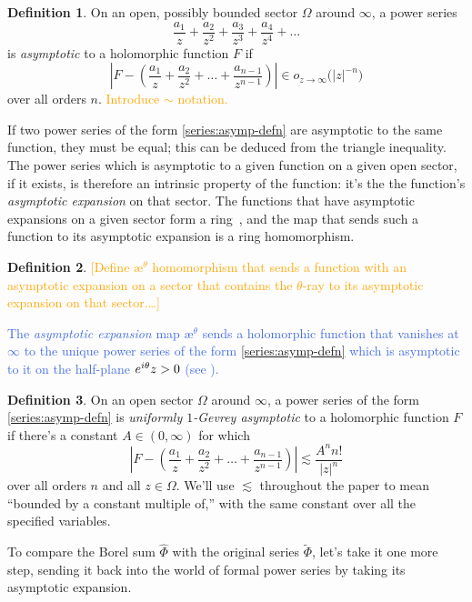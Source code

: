 \documentclass{article}
\let\Re\relax
\DeclareMathOperator{\Re}{Re}
\theoremstyle{definition}
\newtheorem{defn}{Definition}
\newcommand{\series}[1]{\tilde{#1}}
\newcommand{\aexp}{\text{\ae}}
\theoremstyle{plain}
\begin{document}
\begin{defn}
On an open, possibly bounded sector $\Omega$ around $\infty$, a power series
\begin{equation}\label{series:asymp-defn}
\frac{a_1}{z} + \frac{a_2}{z^2} + \frac{a_3}{z^3} + \frac{a_4}{z^4} + \ldots
\end{equation}
is {\em asymptotic} to a holomorphic function $F$ if
\[ \left|F - \left(\frac{a_1}{z} + \frac{a_2}{z^2} + \ldots + \frac{a_{n-1}}{z^{n-1}} \right) \right| \in o_{z \to \infty}\big(|z|^{-n}\big) \]
over all orders $n$. \textcolor{orange}{Introduce $\sim$ notation.}
\end{defn}
If two power series of the form \eqref{series:asymp-defn} are asymptotic to the same function, they must be equal; this can be deduced from the triangle inequality. The power series which is asymptotic to a given function on a given open sector, if it exists, is therefore an intrinsic property of the function: it's the the function's {\em asymptotic expansion} on that sector. The functions that have asymptotic expansions on a given sector form a ring~\cite[Section~A.4]{nikolaev2023existence}, and the map that sends such a function to its asymptotic expansion is a ring homomorphism.

\begin{defn}
\textcolor{orange}{[Define $\aexp^\theta$ homomorphism that sends a function with an asymptotic expansion on a sector that contains the $\theta$-ray to its asymptotic expansion on that sector.\ldots]}
\end{defn}
\textcolor{RoyalBlue}{The {\em asymptotic expansion} map $\aexp^\theta$ sends a holomorphic function that vanishes at $\infty$ to the unique power series of the form \eqref{series:asymp-defn} which is asymptotic to it on the half-plane $\Re e^{i\theta}z > 0$ (see \cite[Theorem~C.11]{nikolaev2023existence}).}
\begin{defn}\label{def:unif-gevrey-asymp}
On an open sector $\Omega$ around $\infty$, a power series of the form \eqref{series:asymp-defn} is {\em uniformly $1$-Gevrey asymptotic} to a holomorphic function $F$ if there's a constant $A \in (0, \infty)$ for which
\[ \left|F - \left(\frac{a_1}{z} + \frac{a_2}{z^2} + \ldots + \frac{a_{n-1}}{z^{n-1}} \right) \right| \lesssim \frac{A^n n!}{|z|^n} \]
over all orders $n$ and all $z \in \Omega$. We'll use $\lesssim$ throughout the paper to mean ``bounded by a constant multiple of,'' with the same constant over all the specified variables.
\end{defn}
To compare the Borel sum $\hat{\Phi}$ with the original series $\series{\Phi}$, let's take it one more step, sending it back into the world of formal power series by taking its asymptotic expansion.
\end{document}
